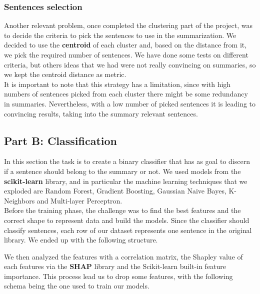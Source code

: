 \subsubsection*{Sentences selection}
Another relevant problem, once completed the clustering part of the project, was to decide the criteria to pick the sentences to use in the summarization. We decided to use the \textbf{centroid} of each cluster and, based on the distance from it, we pick the required number of sentences. We have done some tests on different criteria, but others ideas that we had were not really convincing on summaries, so we kept the centroid distance as metric.\\ It is important to note that this strategy has a limitation, since with high numbers of sentences picked from each cluster there might be some redundancy in summaries. Nevertheless, with a low number of picked sentences it is leading to convincing results, taking into the summary relevant sentences.
\subsection*{Part B: Classification}
In this section the task is to create a binary classifier that has as goal to discern if a sentence should belong to the summary or not. We used models from the \textbf{scikit-learn} library, and in particular the machine learning techniques that we exploded are Random Forest, Gradient Boosting, Gaussian Naive Bayes, K-Neighbors and Multi-layer Perceptron. \\
Before the training phase, the challenge was to find the best features and the correct shape to represent data and build the models. Since the classifier should classify sentences, each row of our dataset represents one sentence in the original library. We ended up with the following structure.\\ 
\begin{table}[H]
    \end{table}
We then analyzed the features with a correlation matrix, the Shapley value of each features via the \textbf{SHAP} library and the Scikit-learn built-in feature importance. This process lead us to drop some features, with the following schema being the one used to train our models. 
    
